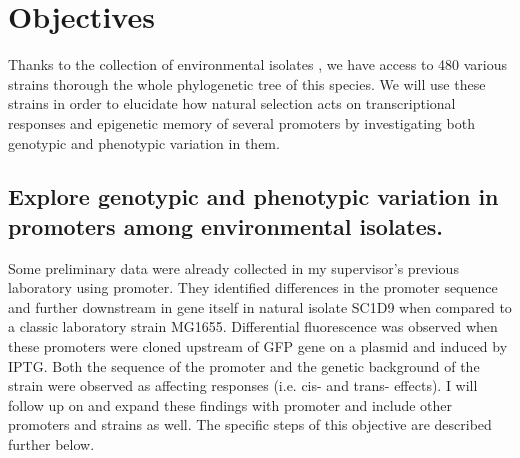 \chapter{Objectives}

\shorthandoff{-} 

Thanks to the collection of environmental  isolates \cite{ishii2006presence}, we have access to 480 various strains thorough the whole phylogenetic tree of this species.
We will use these strains in order to elucidate how natural selection acts on transcriptional responses and epigenetic memory of several promoters by investigating both genotypic and phenotypic variation in them.

\section{Explore genotypic and phenotypic variation in promoters among environmental  isolates.}
Some preliminary data were already collected in my supervisor's previous laboratory using  promoter.
They identified differences in the promoter sequence and further downstream in  gene itself in natural isolate SC1\textunderscore D9 when compared to a classic laboratory strain MG1655.
Differential fluorescence was observed when these promoters were cloned upstream of GFP gene on a plasmid and induced by IPTG.
Both the sequence of the promoter and the genetic background of the strain were observed as affecting responses (i.e. cis- and trans- effects).
I will follow up on and expand these findings with  promoter and include other promoters and strains as well.
The specific steps of this objective are described further below.

